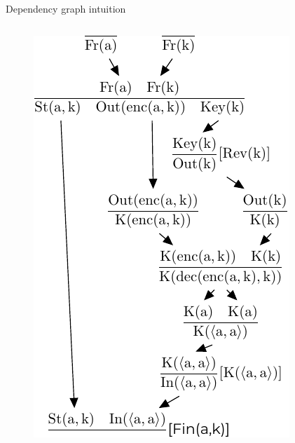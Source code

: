\documentclass[11pt,aspectratio=169]{beamer}
\begin{document}
\begin{frame}[fragile]{Dependency graph intuition}
\begin{columns}
\begin{column}{.4\textwidth}
\begin{figure}
                \includegraphics[width=.8\textwidth]
                    {./figures/lecture_4/dependency_graph_9}%
            \end{figure}
        \end{column}
    \end{columns}
\end{frame}
\end{document}
